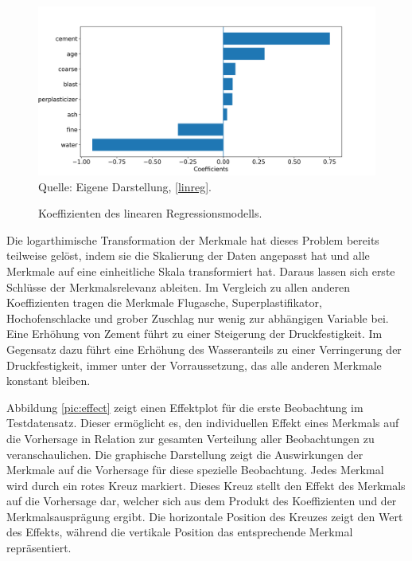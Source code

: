 \begin{figure}[!h]
    \caption{Koeffizienten des linearen Regressionsmodells.}
    \includegraphics[width=1\textwidth]{../scripts/images/coef.png}
    Quelle: Eigene Darstellung, \ref{linreg}.
    \label{pic:coef}
\end{figure}

Die logarthimische Transformation der Merkmale hat dieses Problem bereits 
teilweise gelöst, indem sie die Skalierung der Daten angepasst hat und alle Merkmale auf eine einheitliche Skala transformiert hat.
Daraus lassen sich erste Schlüsse der Merkmalsrelevanz ableiten. Im Vergleich zu allen anderen 
Koeffizienten tragen die Merkmale Flugasche, Superplastifikator, Hochofenschlacke und grober Zuschlag nur wenig zur abhängigen
Variable bei. Eine Erhöhung von Zement führt zu einer Steigerung der Druckfestigkeit. Im Gegensatz dazu führt eine Erhöhung des Wasseranteils 
zu einer Verringerung der Druckfestigkeit, immer unter der Vorraussetzung, das alle
anderen Merkmale konstant bleiben.

Abbildung \ref{pic:effect} zeigt einen Effektplot für die erste Beobachtung im Testdatensatz. Dieser 
ermöglicht es, den individuellen Effekt eines Merkmals auf die Vorhersage in Relation zur gesamten 
Verteilung aller Beobachtungen zu veranschaulichen. Die graphische Darstellung zeigt die Auswirkungen 
der Merkmale auf die Vorhersage für diese spezielle Beobachtung. 
Jedes Merkmal wird durch ein rotes Kreuz markiert. Dieses Kreuz stellt den Effekt des Merkmals auf die Vorhersage dar, 
welcher sich aus dem Produkt des Koeffizienten und der Merkmalsausprägung ergibt.
Die horizontale Position des Kreuzes zeigt den Wert des Effekts, während die vertikale Position das entsprechende Merkmal repräsentiert.


